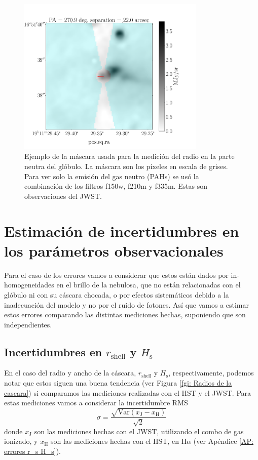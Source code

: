 \documentclass{book}
\begin{document}
\begin{figure}[htb]
    \centering
    \includegraphics[width=0.8\textwidth]{Nuevas imagenes finales/r_0_.pdf}
    \caption{Ejemplo de la máscara usada para la medición del radio en la parte neutra del glóbulo. La máscara son los píxeles en escala de grises. Para ver solo la emisión del gas neutro (PAHs) se usó la combinación de los filtros f150w, f210m y f335m. Estas son observaciones del JWST.}
    \label{Medicion de r_0}
\end{figure}

\section[Errores observacionales]{Estimación de incertidumbres en los parámetros observacionales}

Para el caso de los errores vamos a considerar que estos están dados por in-homogeneidades en el brillo de la nebulosa, que no están relacionadas con el glóbulo ni con su cáscara chocada, o por efectos  sistemáticos debido a la inadecuación del modelo y no por el ruido de fotones. Así que vamos a estimar estos errores comparando las distintas mediciones hechas, suponiendo que son independientes.

\subsection{\boldmath Incertidumbres en $r_\mathrm{shell}$ y $H_\mathrm{s}$}
\label{sec:error-shell}
En el caso del radio y ancho de la cáscara, $r_\mathrm{shell}$ y $H_\mathrm{s}$, respectivamente, podemos notar que estos siguen una buena tendencia (ver Figura \ref{fgi: Radios de la cascara}) si comparamos las mediciones realizadas con el HST y el JWST. Para estas mediciones vamos a considerar la incertidumbre RMS
\begin{equation}
    \sigma=\frac{\sqrt{\mathrm{Var}(x_\mathrm{J}-x_\mathrm{H})}}{\sqrt{2}}
\end{equation}
donde $x_\mathrm{J}$ son las mediciones hechas con el JWST, utilizando el combo de gas ionizado, y $x_\mathrm{H}$ son las mediciones hechas con el HST, en H$\alpha$ (ver Apéndice \ref{AP: errores r_s H_s}).
\end{document}

